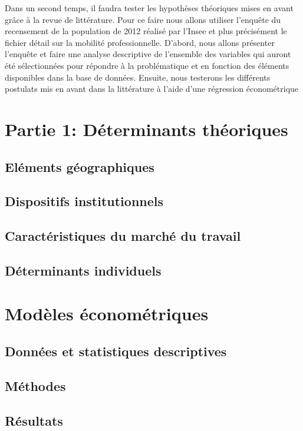 \documentclass[12pt]{article}
\begin{document}
Dans un second temps, il faudra tester les hypothèses théoriques mises en avant grâce à la revue de littérature. Pour ce faire nous allons utiliser l’enquête du recensement de la population de 2012 réalisé par l’Insee et plus précisément le fichier détail sur la mobilité professionnelle. D’abord, nous allons présenter l’enquête et faire une analyse descriptive de l’ensemble des variables qui auront été sélectionnées pour répondre à la problématique et en fonction des éléments disponibles dans la base de données. Ensuite, nous testerons les différents postulats mis en avant dans la littérature à l’aide d’une régression économétrique

\section{Partie 1: Déterminants théoriques}
\subsection{Eléments géographiques}
\subsection{Dispositifs institutionnels}
\subsection{Caractéristiques du marché du travail}
\subsection{Déterminants individuels}
\section{Modèles économétriques}
\subsection{Données et statistiques descriptives}
\subsection{Méthodes}
\subsection{Résultats}



\end{document}
